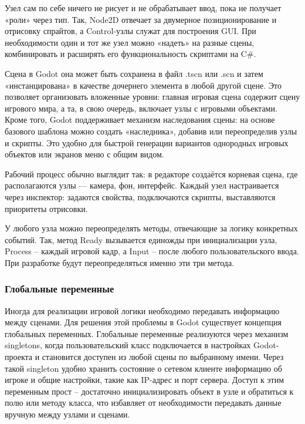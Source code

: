         Узел сам по себе ничего не рисует и не обрабатывает ввод, пока не получает «роли» через тип. Так, Node2D отвечает за двумерное позиционирование и отрисовку спрайтов, а Control-узлы 
        служат для построения GUI. При необходимости один и тот же узел можно «надеть» на разные сцены, комбинировать и расширять его функциональность 
        скриптами на C\#.

        Сцена в Godot она может быть сохранена в файл .tscn или .scn и затем «инстанцирована» в качестве дочернего элемента в любой 
        другой сцене. Это позволяет организовать вложенные уровни: главная игровая сцена содержит сцену игрового мира, а та, в свою очередь, включает узлы с игровыми объектами.
        Кроме того, Godot поддерживает механизм наследования сцены: на основе базового шаблона можно создать «наследника», добавив или переопределив узлы и скрипты. Это удобно для 
        быстрой генерации вариантов однородных игровых объектов или экранов меню с общим видом.

        Рабочий процесс обычно выглядит так: в редакторе создаётся корневая сцена, где располагаются узлы — камера, фон, интерфейс. Каждый узел настраивается 
        через инспектор: задаются свойства, подключаются скрипты, выставляются приоритеты отрисовки.

        У любого узла можно переопределять методы, отвечающие за логику конкретных событий. Так, метод Ready вызывается единожды при инициализации узла, Process -- каждый игровой кадр, а Input -- 
        после любого пользовательского ввода. При разработке будут переопределяться именно эти три метода.

        \subsubsection{Глобальные переменные}

        Иногда для реализации игровой логики необходимо передавать информацию между сценами. Для решения этой проблемы в Godot существует концепция глобальных переменных. 
        Глобальные переменные реализуются через механизм singletons, когда пользовательский класс подключается в настройках Godot-проекта и 
        становится доступен из любой сцены по выбранному имени. Через такой singleton удобно хранить состояние о сетевом клиенте информацию об игроке и общие настройки, такие как IP-адрес и порт
        сервера. Доступ к этим переменным прост -- достаточно инициализировать объект в узле и обратиться к полю или методу класса, что избавляет от необходимости передавать данные вручную между 
        узлами и сценами.

